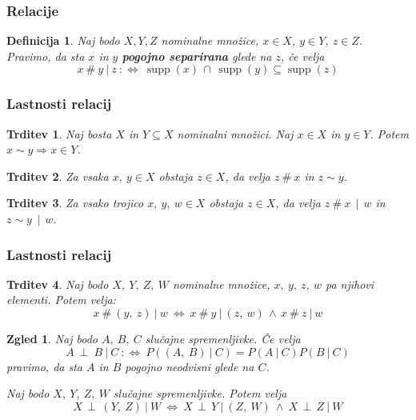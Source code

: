 \documentclass{beamer}
\DeclareMathOperator{\supp}{supp}
\newtheorem{trditev}{Trditev}
\newtheorem{definicija}{Definicija}
\newtheorem{zgled}{Zgled}
\begin{document}
\begin{frame}[fragile]
\frametitle{Relacije}

\begin{definicija}
    Naj bodo \(X, Y, Z\) nominalne množice, \(x \in X\), \(y \in Y\), \(z \in Z\). Pravimo, da sta \(x\) in \(y\) \textbf{pogojno separirana} glede na \(z\), če velja
    \[
        x \ \#\  y \ \vert \ z\ :\Longleftrightarrow\ \supp(x)\, \cap\, \supp(y) \subseteq \supp(z)
    \]
\end{definicija}

\end{frame}

\begin{frame}[fragile]
\frametitle{Lastnosti relacij}

\begin{trditev}
    Naj bosta \(X\) in \(Y \subseteq X\) nominalni množici. Naj \(x \in X\) in \(y \in Y\). Potem \(x \sim y \Rightarrow x \in Y\).
\end{trditev}
\pause
\begin{trditev}
    Za vsaka \(x,\ y \in X\) obstaja \(z \in X\), da velja \(z \ \#\  x\) in \(z \sim y\).
\end{trditev}
\pause
\begin{trditev}
    Za vsako trojico \(x,\ y,\ w \in X\) obstaja \(z \in X\), da velja \(z \ \#\  x\ \ \vert\ \ w\) in \(z \sim y\ \ \vert\ \ w\).
\end{trditev}

\end{frame}

\begin{frame}[fragile]
\frametitle{Lastnosti relacij}

\begin{trditev}
    Naj bodo \(X,\ Y,\ Z,\ W\) nominalne množice, \(x,\ y,\ z,\ w\) pa njihovi elementi. Potem velja:
    \[
        x \ \#\  (y,\ z) \ \vert\ w\ \Longleftrightarrow\ x \ \#\  y \ \vert\ (z,\ w)\, \wedge\, x \ \#\ z \ \vert\ w
    \]
\end{trditev}
\pause
\begin{zgled}
    Naj bodo \(A,\ B,\ C\) slučajne spremenljivke. Če velja
    \[
        A\ \perp\ B\ \vert\ C\ :\Longleftrightarrow\ P((A,\ B) \ \vert\ C) = P(A\ \vert\ C)P(B\ \vert\ C)
    \] pravimo, da sta \(A\) in \(B\) pogojno neodvisni glede na \(C\).
    
    Naj bodo \(X,\ Y,\ Z,\ W\) slučajne spremenljivke. Potem velja
    \[
        X \, \perp\,  (Y,\ Z) \ \vert\ W\ \Longleftrightarrow\ X \, \perp\,  Y \ \vert\ (Z,\ W)\ \wedge\ X \, \perp\, Z \ \vert\ W
    \]
\end{zgled}
\end{frame}
\end{document}
